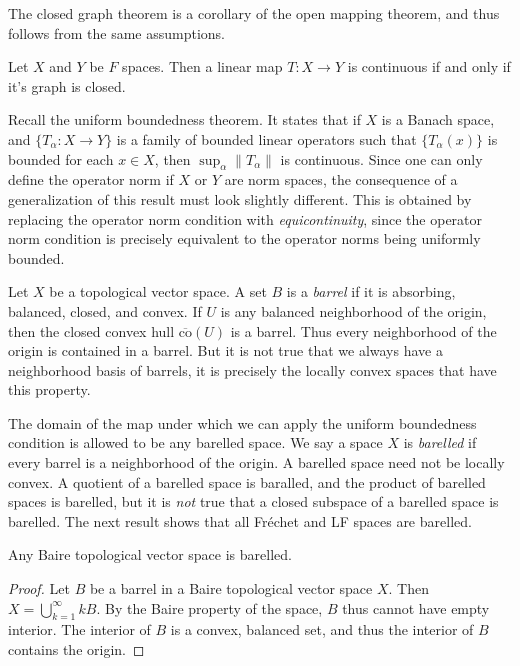 The closed graph theorem is a corollary of the open mapping theorem, and thus follows from the same assumptions.

\begin{theorem}
    Let $X$ and $Y$ be $F$ spaces. Then a linear map $T: X \to Y$ is continuous if and only if it's graph is closed.
\end{theorem}

Recall the uniform boundedness theorem. It states that if $X$ is a Banach space, and $\{ T_\alpha: X \to Y \}$ is a family of bounded linear operators such that $\{ T_\alpha(x) \}$ is bounded for each $x \in X$, then $\sup_\alpha \| T_\alpha \|$ is continuous. Since one can only define the operator norm if $X$ or $Y$ are norm spaces, the consequence of a generalization of this result must look slightly different. This is obtained by replacing the operator norm condition with \emph{equicontinuity}, since the operator norm condition is precisely equivalent to the operator norms being uniformly bounded.

Let $X$ be a topological vector space. A set $B$ is a \emph{barrel} if it is absorbing, balanced, closed, and convex. If $U$ is any balanced neighborhood of the origin, then the closed convex hull $\overline{\text{co}}(U)$ is a barrel. Thus every neighborhood of the origin is contained in a barrel. But it is not true that we always have a neighborhood basis of barrels, it is precisely the locally convex spaces that have this property.

The domain of the map under which we can apply the uniform boundedness condition is allowed to be any barelled space. We say a space $X$ is \emph{barelled} if every barrel is a neighborhood of the origin. A barelled space need not be locally convex. A quotient of a barelled space is baralled, and the product of barelled spaces is barelled, but it is \emph{not} true that a closed subspace of a barelled space is barelled. The next result shows that all Fr\'{e}chet and LF spaces are barelled.

\begin{theorem}
    Any Baire topological vector space is barelled.
\end{theorem}
\begin{proof}
    Let $B$ be a barrel in a Baire topological vector space $X$. Then $X = \bigcup_{k = 1}^\infty kB$. By the Baire property of the space, $B$ thus cannot have empty interior. The interior of $B$ is a convex, balanced set, and thus the interior of $B$ contains the origin.
\end{proof}

